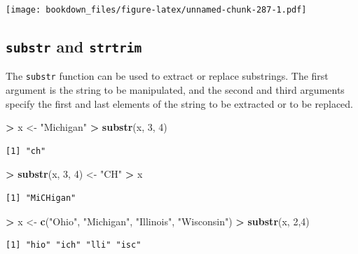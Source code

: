 \documentclass[]{krantz}
\makeatletter
\newenvironment{Shaded}{\begin{snugshade}}{\end{snugshade}}
\newcommand{\KeywordTok}[1]{\textcolor[rgb]{0.27,0.27,0.27}{\textbf{#1}}}
\newcommand{\DecValTok}[1]{\textcolor[rgb]{0.06,0.06,0.06}{#1}}
\newcommand{\StringTok}[1]{\textcolor[rgb]{0.5,0.5,0.5}{#1}}
\newcommand{\OperatorTok}[1]{\textcolor[rgb]{0.43,0.43,0.43}{\textbf{#1}}}
\newcommand{\NormalTok}[1]{#1}
\newenvironment{kframe}{%
\medskip{}
\setlength{\fboxsep}{.8em}
 \def\at@end@of@kframe{}%
 \ifinner\ifhmode%
  \def\at@end@of@kframe{\end{minipage}}%
  \begin{minipage}{\columnwidth}%
 \fi\fi%
 \def\FrameCommand##1{\hskip\@totalleftmargin \hskip-\fboxsep
 \colorbox{shadecolor}{##1}\hskip-\fboxsep
     \hskip-\linewidth \hskip-\@totalleftmargin \hskip\columnwidth}%
 \MakeFramed {\advance\hsize-\width
   \@totalleftmargin\z@ \linewidth\hsize
   \@setminipage}}%
 {\par\unskip\endMakeFramed%
 \at@end@of@kframe}
\renewenvironment{Shaded}{\begin{kframe}}{\end{kframe}}
\makeatother
\begin{document}
\texttt{[image: bookdown\_files/figure-latex/unnamed-chunk-287-1.pdf]}

\subsection{\texorpdfstring{\texttt{substr} and
\texttt{strtrim}}{substr and strtrim}}\label{substr-and-strtrim}

The \texttt{substr} function can be used to extract or replace
substrings. The first argument is the string to be manipulated, and the
second and third arguments specify the first and last elements of the
string to be extracted or to be replaced.

\begin{Shaded}
\begin{Highlighting}[]
\OperatorTok{>}\StringTok{ }\NormalTok{x <-}\StringTok{ "Michigan"}
\OperatorTok{>}\StringTok{ }\KeywordTok{substr}\NormalTok{(x, }\DecValTok{3}\NormalTok{, }\DecValTok{4}\NormalTok{)}
\end{Highlighting}
\end{Shaded}

\begin{verbatim}
[1] "ch"
\end{verbatim}

\begin{Shaded}
\begin{Highlighting}[]
\OperatorTok{>}\StringTok{ }\KeywordTok{substr}\NormalTok{(x, }\DecValTok{3}\NormalTok{, }\DecValTok{4}\NormalTok{) <-}\StringTok{ "CH"}
\OperatorTok{>}\StringTok{ }\NormalTok{x}
\end{Highlighting}
\end{Shaded}

\begin{verbatim}
[1] "MiCHigan"
\end{verbatim}

\begin{Shaded}
\begin{Highlighting}[]
\OperatorTok{>}\StringTok{ }\NormalTok{x <-}\StringTok{ }\KeywordTok{c}\NormalTok{(}\StringTok{"Ohio"}\NormalTok{, }\StringTok{"Michigan"}\NormalTok{, }\StringTok{"Illinois"}\NormalTok{, }\StringTok{"Wisconsin"}\NormalTok{)}
\OperatorTok{>}\StringTok{ }\KeywordTok{substr}\NormalTok{(x, }\DecValTok{2}\NormalTok{,}\DecValTok{4}\NormalTok{)}
\end{Highlighting}
\end{Shaded}

\begin{verbatim}
[1] "hio" "ich" "lli" "isc"
\end{verbatim}
\end{document}
